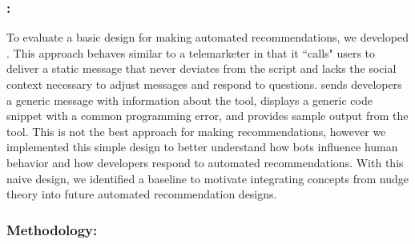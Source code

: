 \subsubsection{\telemarketer:}

To evaluate a basic design for making automated recommendations, we developed \telemarketer. This approach behaves similar to a telemarketer in that it ``calls" users to deliver a static message that never deviates from the script and lacks the social context necessary to adjust messages and respond to questions. \telemarketer sends developers a generic message with information about the tool, displays a generic code snippet with a common programming error, and provides sample output from the tool. This is not the best approach for making recommendations, however we implemented this simple design to better understand how bots influence human behavior and how developers respond to automated recommendations. With this naive design, we identified a baseline to motivate integrating concepts from nudge theory into future automated recommendation designs. 


\subsubsection{Methodology:}

